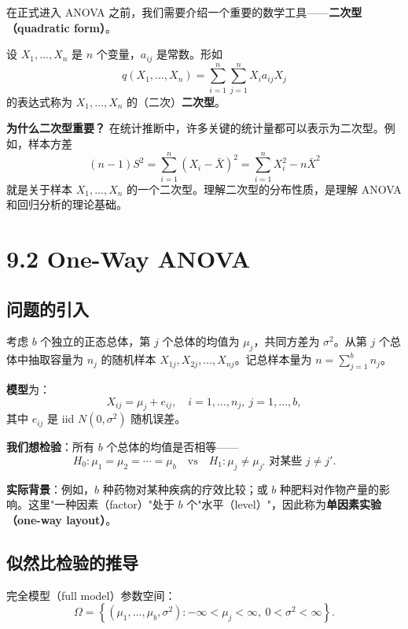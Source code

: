 在正式进入 ANOVA 之前，我们需要介绍一个重要的数学工具——\textbf{二次型（quadratic form）}。

\begin{definition}[二次型]\label{def:quadratic-form}
设 $X_1, \ldots, X_n$ 是 $n$ 个变量，$a_{ij}$ 是常数。形如
\[
q(X_1, \ldots, X_n) = \sum_{i=1}^n \sum_{j=1}^n X_i a_{ij} X_j
\]
的表达式称为 $X_1, \ldots, X_n$ 的（二次）\textbf{二次型}。
\end{definition}

\textbf{为什么二次型重要？} 在统计推断中，许多关键的统计量都可以表示为二次型。例如，样本方差
\[
(n-1)S^2 = \sum_{i=1}^n (X_i - \bar{X})^2 = \sum_{i=1}^n X_i^2 - n\bar{X}^2
\]
就是关于样本 $X_1, \ldots, X_n$ 的一个二次型。理解二次型的分布性质，是理解 ANOVA 和回归分析的理论基础。

\section{9.2 One-Way ANOVA}\label{sec:9.2}

\subsection{问题的引入}

考虑 $b$ 个独立的正态总体，第 $j$ 个总体的均值为 $\mu_j$，共同方差为 $\sigma^2$。从第 $j$ 个总体中抽取容量为 $n_j$ 的随机样本 $X_{1j}, X_{2j}, \ldots, X_{nj}$。记总样本量为 $n = \sum_{j=1}^b n_j$。

\textbf{模型}为：
\[
X_{ij} = \mu_j + e_{ij}, \quad i = 1, \ldots, n_j,\ j = 1, \ldots, b,
\label{eq:one-way-model}
\]
其中 $e_{ij}$ 是 iid $N(0, \sigma^2)$ 随机误差。

\textbf{我们想检验}：所有 $b$ 个总体的均值是否相等——
\[
H_0: \mu_1 = \mu_2 = \cdots = \mu_b \quad \text{vs} \quad H_1: \mu_j \neq \mu_{j'} \text{ 对某些 } j \neq j'.
\label{eq:one-way-hypotheses}
\]

\textbf{实际背景}：例如，$b$ 种药物对某种疾病的疗效比较；或 $b$ 种肥料对作物产量的影响。这里"一种因素（factor）"处于 $b$ 个"水平（level）"，因此称为\textbf{单因素实验（one-way layout）}。

\subsection{似然比检验的推导}

完全模型（full model）参数空间：
\[
\Omega = \left\{(\mu_1, \ldots, \mu_b, \sigma^2): -\infty < \mu_j < \infty,\ 0 < \sigma^2 < \infty \right\}.
\]

